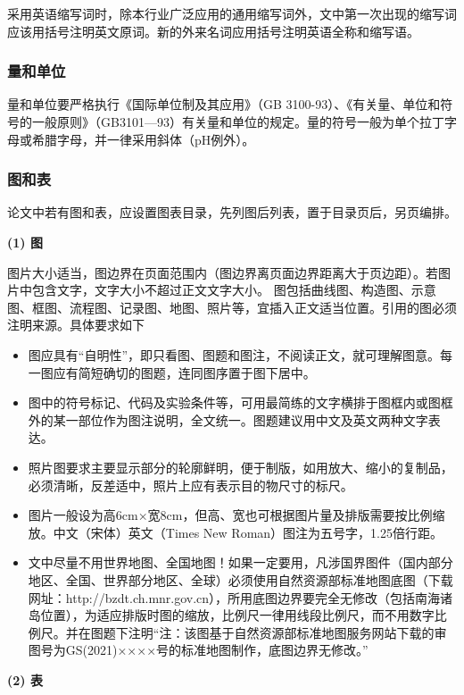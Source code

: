 {采用英语缩写词时，除本行业广泛应用的通用缩写词外，文中第一次出现的缩写词应该用括号注明英文原词。新的外来名词应用括号注明英语全称和缩写语。

\subsubsection{量和单位}

量和单位要严格执行《国际单位制及其应用》（GB 3100-93）、《有关量、单位和符号的一般原则》（GB3101—93）有关量和单位的规定。量的符号一般为单个拉丁字母或希腊字母，并一律采用斜体（pH例外）。

\subsubsection{图和表}

论文中若有图和表，应设置图表目录，先列图后列表，置于目录页后，另页编排。

\textbf{(1) 图}

图片大小适当，图边界在页面范围内（图边界离页面边界距离大于页边距）。若图片中包含文字，文字大小不超过正文文字大小。
图包括曲线图、构造图、示意图、框图、流程图、记录图、地图、照片等，宜插入正文适当位置。引用的图必须注明来源。具体要求如下
\begin{itemize}
    \item 图应具有“自明性”，即只看图、图题和图注，不阅读正文，就可理解图意。每一图应有简短确切的图题，连同图序置于图下居中。
    \item 图中的符号标记、代码及实验条件等，可用最简练的文字横排于图框内或图框外的某一部位作为图注说明，全文统一。图题建议用中文及英文两种文字表达。
    \item 照片图要求主要显示部分的轮廓鲜明，便于制版，如用放大、缩小的复制品，必须清晰，反差适中，照片上应有表示目的物尺寸的标尺。
    \item 图片一般设为高6cm×宽8cm，但高、宽也可根据图片量及排版需要按比例缩放。中文（宋体）英文（Times New Roman）图注为五号字，1.25倍行距。
    \item 文中尽量不用世界地图、全国地图！如果一定要用，凡涉国界图件（国内部分地区、全国、世界部分地区、全球）必须使用自然资源部标准地图底图（下载网址：http://bzdt.ch.mnr.gov.cn），所用底图边界要完全无修改（包括南海诸岛位置），为适应排版时图的缩放，比例尺一律用线段比例尺，而不用数字比例尺。并在图题下注明“注：该图基于自然资源部标准地图服务网站下载的审图号为GS(2021)××××号的标准地图制作，底图边界无修改。”
\end{itemize}


\textbf{(2) 表}

}
